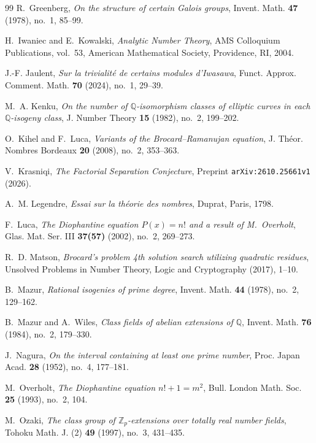 \documentclass[11pt,reqno]{amsart}
\theoremstyle{remark}
\numberwithin{equation}{section}
\newcommand{\Z}{\mathbb{Z}}
\newcommand{\Q}{\mathbb{Q}}
\begin{document}
\begin{thebibliography}{99}
R.~Greenberg, \emph{On the structure of certain Galois groups}, Invent. Math. \textbf{47} (1978), no.~1, 85--99.

H.~Iwaniec and E.~Kowalski, \emph{Analytic Number Theory}, AMS Colloquium Publications, vol.~53, American Mathematical Society, Providence, RI, 2004.

J.-F. Jaulent, \emph{Sur la trivialit\'e de certains modules d'Iwasawa}, Funct. Approx. Comment. Math. \textbf{70} (2024), no.~1, 29--39.

M.~A. Kenku, \emph{On the number of $\Q$-isomorphism classes of elliptic curves in each $\Q$-isogeny class}, J. Number Theory \textbf{15} (1982), no.~2, 199--202.

O.~Kihel and F.~Luca, \emph{Variants of the Brocard--Ramanujan equation}, J. Th\'eor. Nombres Bordeaux \textbf{20} (2008), no.~2, 353--363.

V.~Krasniqi, \emph{The Factorial Separation Conjecture}, Preprint \texttt{arXiv:2610.25661v1} (2026).

A.~M. Legendre, \emph{Essai sur la th\'eorie des nombres}, Duprat, Paris, 1798.

F.~Luca, \emph{The Diophantine equation $P(x) = n!$ and a result of M.~Overholt}, Glas. Mat. Ser. III \textbf{37(57)} (2002), no.~2, 269--273.

R.~D. Matson, \emph{Brocard's problem 4th solution search utilizing quadratic residues}, Unsolved Problems in Number Theory, Logic and Cryptography (2017), 1--10.

B.~Mazur, \emph{Rational isogenies of prime degree}, Invent. Math. \textbf{44} (1978), no.~2, 129--162.

B.~Mazur and A.~Wiles, \emph{Class fields of abelian extensions of $\Q$}, Invent. Math. \textbf{76} (1984), no.~2, 179--330.

J.~Nagura, \emph{On the interval containing at least one prime number}, Proc. Japan Acad. \textbf{28} (1952), no.~4, 177--181.

M.~Overholt, \emph{The Diophantine equation $n! + 1 = m^2$}, Bull. London Math. Soc. \textbf{25} (1993), no.~2, 104.

M.~Ozaki, \emph{The class group of $\Z_p$-extensions over totally real number fields}, Tohoku Math. J. (2) \textbf{49} (1997), no.~3, 431--435.


\end{thebibliography}
\end{document}
